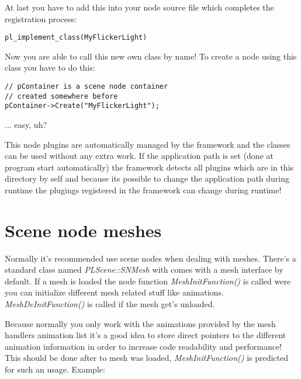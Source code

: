 At last you have to add this into your node source file which completes the registration process:

\begin{lstlisting}[caption=Finishing RTTI class registration process]
pl_implement_class(MyFlickerLight)
\end{lstlisting}

Now you are able to call this new own class by name! To create a node using this class you have to do this:

\begin{lstlisting}[caption=Creating an instance of an own scene node class]
// pContainer is a scene node container
// created somewhere before
pContainer->Create("MyFlickerLight");
\end{lstlisting}

... easy, uh?

This node plugins are automatically managed by the framework and the classes can be used without any extra work. If the application path is set (done at program start automatically) the framework detects all plugins which are in this directory by self and because its possible to change the application path during runtime the plugings registered in the framework can change during runtime!




\section{Scene node meshes}
Normally it's recommended use scene nodes when dealing with meshes. There's a standard class named \emph{PLScene::SNMesh} with comes with a mesh interface by default. If a mesh is loaded the node function \emph{MeshInitFunction()} is called were you can initialize different mesh related stuff like animations. \emph{MeshDeInitFunction()} is called if the mesh get's unloaded.

Because normally you only work with the animations provided by the mesh handlers animation list it's a good idea to store direct pointers to the different animation information in order to increase code readability and performance! This should be done after to mesh was loaded, \emph{MeshInitFunction()} is predicted for such an usage. Example:

